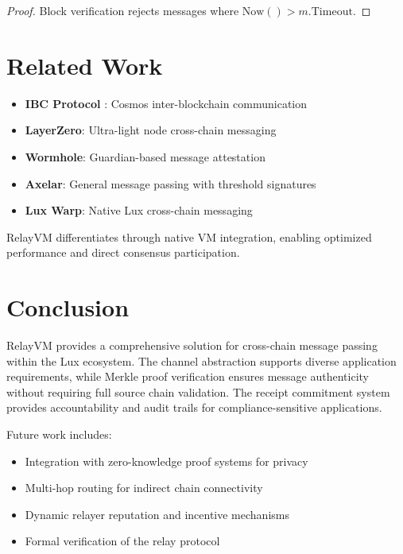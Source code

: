 \documentclass[11pt,twocolumn]{article}
\begin{document}
\begin{proof}
Block verification rejects messages where $\text{Now}() > m.\text{Timeout}$.
\end{proof}

\section{Related Work}

\begin{itemize}
\item \textbf{IBC Protocol} \cite{ibc}: Cosmos inter-blockchain communication
\item \textbf{LayerZero}: Ultra-light node cross-chain messaging
\item \textbf{Wormhole}: Guardian-based message attestation
\item \textbf{Axelar}: General message passing with threshold signatures
\item \textbf{Lux Warp}: Native Lux cross-chain messaging
\end{itemize}

RelayVM differentiates through native VM integration, enabling optimized performance and direct consensus participation.

\section{Conclusion}

RelayVM provides a comprehensive solution for cross-chain message passing within the Lux ecosystem. The channel abstraction supports diverse application requirements, while Merkle proof verification ensures message authenticity without requiring full source chain validation. The receipt commitment system provides accountability and audit trails for compliance-sensitive applications.

Future work includes:
\begin{itemize}
\item Integration with zero-knowledge proof systems for privacy
\item Multi-hop routing for indirect chain connectivity
\item Dynamic relayer reputation and incentive mechanisms
\item Formal verification of the relay protocol
\end{itemize}
\end{document}
